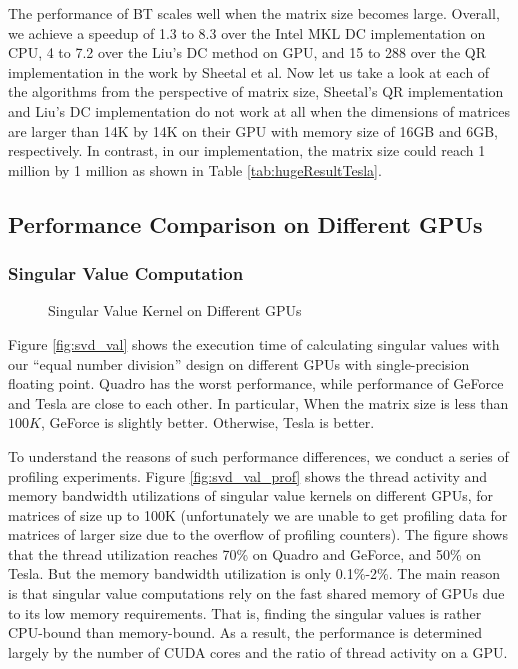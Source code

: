 The performance of BT scales well when the matrix size becomes large.
Overall, we achieve a speedup of 1.3 to 8.3 over the Intel MKL
DC implementation on CPU, 4 to 7.2 over the Liu's
DC method on GPU, and 15 to 288 over the QR implementation in the work by Sheetal et al.
Now let us take a look at each of the algorithms from the perspective of matrix size, Sheetal's QR implementation and Liu's DC implementation do not work at all when the dimensions of matrices are larger than 14K by 14K on their GPU with memory size of 16GB and 6GB, respectively. In contrast, in our implementation, the matrix size could reach 1 million by 1 million as shown in Table \ref{tab:hugeResultTesla}.

\vspace{-0.1in}
\subsection{Performance Comparison on Different GPUs}
\subsubsection{Singular Value Computation}
\begin{figure}[hbpt]
\vspace{-0.3in}
\centering
\vspace{-0.1in}
  \caption{Singular Value Kernel on Different GPUs}
  \label{fig:svdval}
\vspace{-0.3in}
\end{figure}

Figure \ref{fig:svd_val} shows the execution time of calculating singular values with our ``equal number division'' design on different GPUs with single-precision floating point.
Quadro has the worst performance, while performance of GeForce and Tesla are close to each other.
In particular, When the matrix size is less than $100K$, GeForce is slightly better. Otherwise, Tesla is better. 

To understand the reasons
of such performance differences, we conduct a series of profiling experiments.
Figure \ref{fig:svd_val_prof} shows the thread activity and memory bandwidth utilizations of singular value kernels on different GPUs, for matrices of size up to 
100K (unfortunately we are unable to get profiling data for matrices of larger size due to the overflow of profiling counters). 
The figure shows that the thread utilization reaches 70\% on Quadro and GeForce, and 50\% on Tesla. 
But the memory bandwidth utilization is only 0.1\%-2\%.
The main reason is that singular value computations rely on the fast shared memory
of GPUs due to its low memory requirements. That is, finding the singular
values is rather CPU-bound than memory-bound. 
As a result, the performance is determined largely by the number of CUDA cores and the ratio of thread activity on a GPU.

